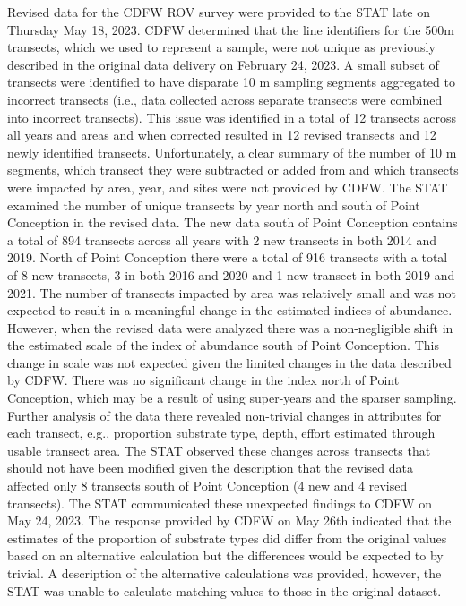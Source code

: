 \documentclass[11pt,
  letterpaper,
]{article}
\begin{document}
Revised data for the CDFW ROV survey were provided to the STAT late on Thursday May 18, 2023. CDFW determined that the line identifiers for the 500m transects, which we used to represent a sample, were not unique as previously described in the original data delivery on February 24, 2023. A small subset of transects were identified to have disparate 10 m sampling segments aggregated to incorrect transects (i.e., data collected across separate transects were combined into incorrect transects). This issue was identified in a total of 12 transects across all years and areas and when corrected resulted in 12 revised transects and 12 newly identified transects. Unfortunately, a clear summary of the number of 10 m segments, which transect they were subtracted or added from and which transects were impacted by area, year, and sites were not provided by CDFW. The STAT examined the number of unique transects by year north and south of Point Conception in the revised data. The new data south of Point Conception contains a total of 894 transects across all years with 2 new transects in both 2014 and 2019. North of Point Conception there were a total of 916 transects with a total of 8 new transects, 3 in both 2016 and 2020 and 1 new transect in both 2019 and 2021. The number of transects impacted by area was relatively small and was not expected to result in a meaningful change in the estimated indices of abundance. However, when the revised data were analyzed there was a non-negligible shift in the estimated scale of the index of abundance south of Point Conception. This change in scale was not expected given the limited changes in the data described by CDFW. There was no significant change in the index north of Point Conception, which may be a result of using super-years and the sparser sampling. Further analysis of the data there revealed non-trivial changes in attributes for each transect, e.g., proportion substrate type, depth, effort estimated through usable transect area. The STAT observed these changes across transects that should not have been modified given the description that the revised data affected only 8 transects south of Point Conception (4 new and 4 revised transects). The STAT communicated these unexpected findings to CDFW on May 24, 2023. The response provided by CDFW on May 26th indicated that the estimates of the proportion of substrate types did differ from the original values based on an alternative calculation but the differences would be expected to by trivial. A description of the alternative calculations was provided, however, the STAT was unable to calculate matching values to those in the original dataset.
\end{document}
